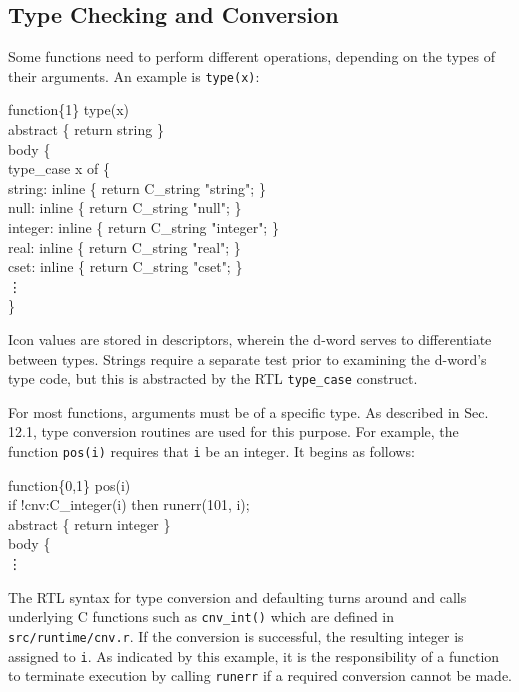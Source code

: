 \subsection{Type Checking and Conversion}

Some functions need to perform different operations, depending on the
types of their arguments. An example is \texttt{type(x)}:

\goodbreak
\begin{iconcode}
function\{1\} type(x)\\
abstract \{ return string \} \\
body \{\\
\>type\_case x of  \{\\
\>\>      string:   inline \{ return C\_string "string";    \} \\
\>\>      null:     inline \{ return C\_string "null";      \} \\
\>\>      integer:  inline \{ return C\_string "integer";   \} \\
\>\>      real:     inline \{ return C\_string "real";      \} \\
\>\>      cset:     inline \{ return C\_string "cset";      \} \\
\>\>      \vdots \\
\>\} \\
\end{iconcode}

\noindent
Icon values are stored in descriptors, wherein the d-word serves to
differentiate between types. Strings require a separate test prior
to examining the d-word's type code, but this is abstracted by the
RTL \texttt{type\_case} construct.

For most functions, arguments must be of a specific type. As described in
Sec. 12.1, type conversion routines are used for this purpose. For example,
the function \texttt{pos(i)} requires that \texttt{i} be an integer.
It begins as follows:

\goodbreak
\begin{iconcode}
function\{0,1\} pos(i)\\
\>   if !cnv:C\_integer(i) then runerr(101, i); \\
\>   abstract \{ return integer \} \\
body \{\\
\> \vdots
\end{iconcode}

\noindent
The RTL syntax for type conversion and defaulting turns around and
calls underlying C functions such as \texttt{cnv\_int()} which are
defined in \texttt{src/runtime/cnv.r}.
If the conversion is successful, the resulting integer is assigned
to \texttt{i}. As indicated by this example, it is the responsibility of a
function to terminate execution by calling \texttt{runerr} if a required
conversion cannot be made.

